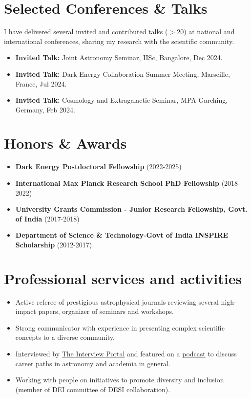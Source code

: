 \documentclass[a4paper,10pt]{article}
\begin{document}
\section*{Selected Conferences \& Talks}
I have delivered several invited and contributed talks ($>20$) at national and international conferences, sharing my research with the scientific community.
\begin{itemize}[noitemsep, topsep=0pt]
\item \textbf{Invited Talk:} Joint Astronomy Seminar, IISc, Bangalore, Dec 2024.
\item \textbf{Invited Talk:} Dark Energy Collaboration Summer Meeting, Marseille, France, Jul 2024.
    \item \textbf{Invited Talk:} Cosmology and Extragalactic Seminar, MPA Garching, Germany, Feb 2024.
\end{itemize}

\section*{Honors \& Awards}
\begin{itemize}[noitemsep, topsep=0pt]
 \item \textbf{Dark Energy Postdoctoral Fellowship} (2022-2025)
    \item \textbf{International Max Planck Research School PhD Fellowship} (2018–2022)
    \item \textbf{University Grants Commission - Junior Research Fellowship, Govt. of India} (2017-2018)
     \item \textbf{Department of Science \& Technology-Govt of India INSPIRE Scholarship}  (2012-2017)
\end{itemize}

\section*{Professional services and activities}
\begin{itemize}[noitemsep, topsep=0pt]
    \item Active referee of prestigious astrophysical journals reviewing several high-impact papers, organizer of seminars and workshops.
     \item Strong communicator with experience in presenting complex scientific concepts to a diverse community.
    \item Interviewed by \href{https://theinterviewportal.com/2020/03/13/astrophysicist-interview-8/}{The Interview Portal} and featured on a \href{https://www.youtube.com/watch?v=WmA_PnYLeCg}{podcast} to discuss career paths in astronomy and academia in general.
    \item Working with people on initiatives to promote diversity and inclusion (member of DEI committee
of DESI collaboration).
\end{itemize}
\end{document}
